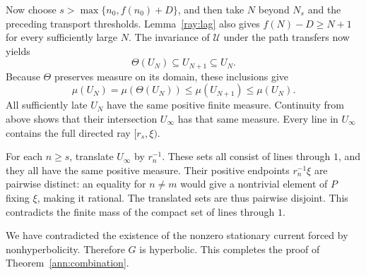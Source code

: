 Now choose $s>\max\{n_0,f(n_0)+D\}$, and then take $N$ beyond
$N_s$ and the preceding transport thresholds. Lemma~\ref{ray:lag}
also gives $f(N)-D\geq N+1$ for every sufficiently large $N$.
The invariance of $\mathcal U$ under the path transfers now yields
\begin{equation}\label{ray:nesting}
 \Theta(U_N)\subseteq U_{N+1}\subseteq U_N.
\end{equation}
Because $\Theta$ preserves measure on its domain, these inclusions give
\[
 \mu(U_N)=\mu(\Theta(U_N))
       \leq\mu(U_{N+1})\leq\mu(U_N).
\]
All sufficiently late $U_N$ have the same positive finite measure.
Continuity from above shows that their intersection $U_\infty$ has that
same measure. Every line in $U_\infty$ contains the full directed ray
$[r_s,\xi)$.

For each $n\geq s$, translate $U_\infty$ by $r_n^{-1}$. These sets all
consist of lines through $1$, and they all have the same positive
measure. Their positive endpoints $r_n^{-1}\xi$ are pairwise distinct:
an equality for $n\ne m$ would give a nontrivial element of $P$ fixing
$\xi$, making it rational. The translated sets are thus pairwise
disjoint. This contradicts the finite mass of the compact set of lines
through $1$.

We have contradicted the existence of the nonzero stationary current
forced by nonhyperbolicity. Therefore $G$ is hyperbolic.
This completes the proof of Theorem~\ref{ann:combination}.
